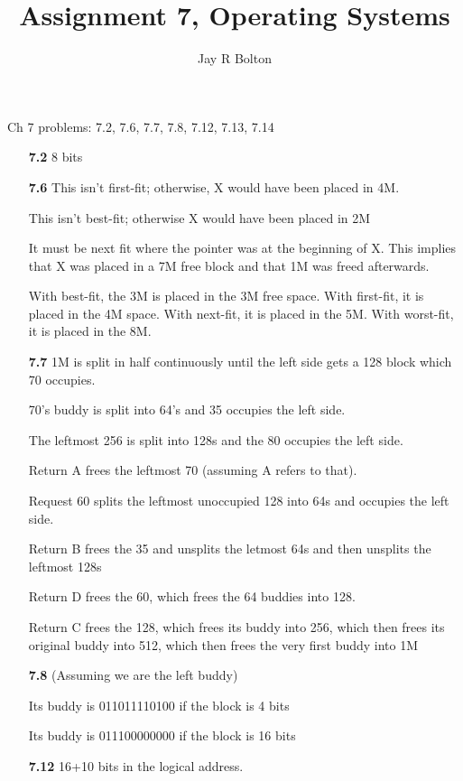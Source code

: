 \documentclass{article}
\title{Assignment 7, Operating Systems}
\author{Jay R Bolton}
\begin{document}
\maketitle

Ch 7 problems: 7.2, 7.6, 7.7, 7.8, 7.12, 7.13, 7.14

\begin{enumerate}

\item[\textbf{7.2}]
8 bits

\item[\textbf{7.6}]
This isn't first-fit; otherwise, X would have been placed in 4M.

This isn't best-fit; otherwise X would have been placed in 2M

It must be next fit where the pointer was at the beginning of X. This implies
that X was placed in a 7M free block and that 1M was freed afterwards.

With best-fit, the 3M is placed in the 3M free space. With first-fit, it is
placed in the 4M space. With next-fit, it is placed in the 5M. With worst-fit,
it is placed in the 8M.

\item[\textbf{7.7}]
1M is split in half continuously until the left side gets a 128 block which 70 occupies.

70's buddy is split into 64's and 35 occupies the left side.

The leftmost 256 is split into 128s and the 80 occupies the left side.

Return A frees the leftmost 70 (assuming A refers to that).

Request 60 splits the leftmost unoccupied 128 into 64s and occupies the left side.

Return B frees the 35 and unsplits the letmost 64s and then unsplits the leftmost 128s

Return D frees the 60, which frees the 64 buddies into 128.

Return C frees the 128, which frees its buddy into 256, which then frees its
original buddy into 512, which then frees the very first buddy into 1M

\item[\textbf{7.8}]
(Assuming we are the left buddy)

Its buddy is 011011110100 if the block is 4 bits

Its buddy is 011100000000 if the block is 16 bits

\item[\textbf{7.12}]
16+10 bits in the logical address.


\end{enumerate}
\end{document}
